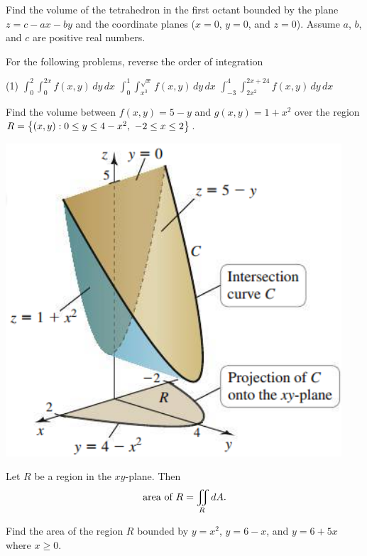 \documentclass[../mathNotesPreamble]{subfiles}
\begin{document}
  \begin{ex*}
    Find the volume of the tetrahedron in the first octant bounded by the plane $z=c-ax-by$ and the coordinate planes ($x=0$, $y=0$, and $z=0$). Assume $a$, $b$, and $c$ are positive real numbers.
  \end{ex*}
  \pagebreak

  \begin{ex*}
    For the following problems, reverse the order of integration
  \end{ex*}
  \begin{tasks}[after-item-skip=\stretch{1}, label=\textbullet](1)
    \task 
      $\displaystyle \int_{0}^{2} \int_{0}^{2x} f(x,y)\,dy\,dx$
    \task 
      $\displaystyle \int_{0}^{1} \int_{x^3}^{\sqrt{x}} f(x,y)\,dy\,dx$
    \task 
      $\displaystyle \int_{-3}^{4} \int_{2x^2}^{2x+24} f(x,y)\,dy\,dx$
  \end{tasks}
  \pagebreak

  \begin{ex*}
    Find the volume between $f(x,y)=5-y$ and $g(x,y)=1+x^2$ over the region $R={\left\{(x,y): 0\leq y\leq 4-x^2,\ -2\leq x\leq 2\right\}}$.
  \end{ex*}
  \begin{flushright}
    \includegraphics[width=0.3\linewidth]{../images/briggs_16_02/fig16_23}
  \end{flushright}
  \pagebreak

  \begin{thmBox*}
    Let $R$ be a region in the $xy$-plane. Then
      \[\textnormal{area of } R=\iint\limits_R dA.\]
  \end{thmBox*}

  \begin{ex*}
    Find the area of the region $R$ bounded by $y=x^2$, $y=6-x$, and $y=6+5x$ where $x\geq 0$.
  \end{ex*}

  \pagebreak
  
\end{document}
